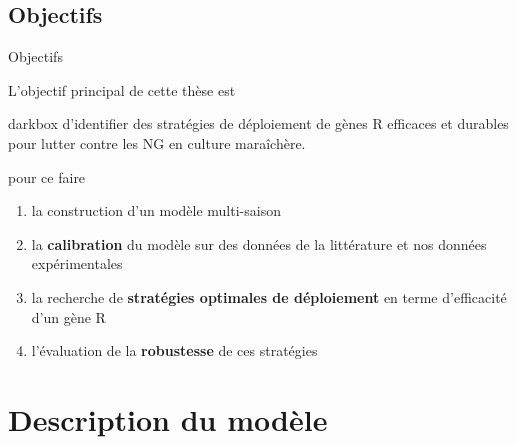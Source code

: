 \subsection{Objectifs}


\begin{frame}{Objectifs}

L’objectif principal de cette thèse est 

	\begin{center}\mbox{}
		\begin{beamercolorbox}[wd=.8\textwidth,sep=1ex,rounded=true]{darkbox}	
d’identifier des stratégies de déploiement de gènes R efficaces et
durables pour lutter contre les NG en culture maraîchère.
		\end{beamercolorbox}
	\end{center}\pause  
	pour ce faire
			\begin{enumerate}[itemsep=15pt]
	      \item la construction d'un modèle multi-saison 
       \item  la \textbf{calibration} du modèle sur des données de la littérature et nos données expérimentales 
         \item la recherche de \textbf{stratégies optimales de déploiement} en terme d'efficacité d'un gène R
          \item l’évaluation de la \textbf{robustesse} de ces stratégies
 	
	\end{enumerate}	
\end{frame}









\section[Modèle]{Description du modèle}


